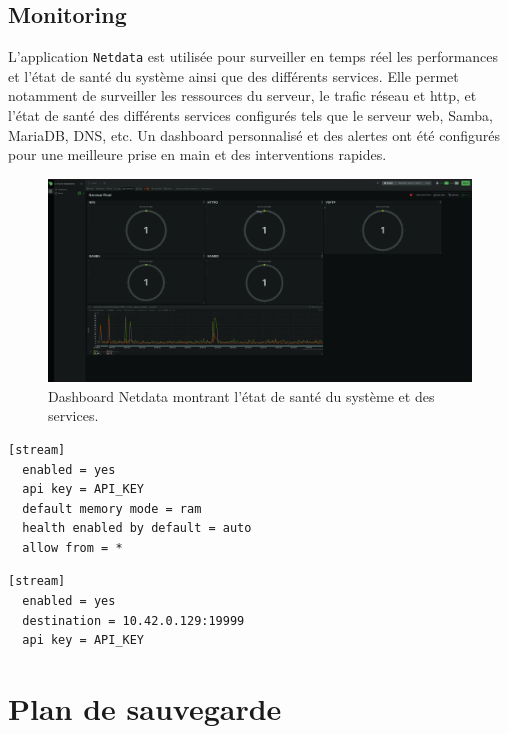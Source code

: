 \documentclass[a4paper,12pt]{article}
\begin{document}
\subsection{Monitoring}

L'application  \texttt{Netdata} est utilisée pour surveiller en temps réel les performances et l'état de santé du système ainsi que des différents services. Elle permet notamment de surveiller les ressources du serveur, le trafic réseau et http, et l'état de santé des différents services configurés tels que le serveur web, Samba, MariaDB, DNS, etc. Un dashboard personnalisé et des alertes ont été configurés pour une meilleure prise en main et des interventions rapides.

\begin{figure}[htbp]
    \centering
    \includegraphics[width=\textwidth]{netdata.png}
    \caption{Dashboard Netdata montrant l'état de santé du système et des services.}
    \label{fig:netdata-dashboard}
\end{figure}

\begin{lstlisting}[caption={Configuration Netdata Serveur – /etc/netdata/stream.conf}]
[stream]
  enabled = yes
  api key = API_KEY
  default memory mode = ram
  health enabled by default = auto
  allow from = *
\end{lstlisting}

\begin{lstlisting}[caption={Configuration Netdata Client – /etc/netdata/stream.conf}]
[stream]
  enabled = yes
  destination = 10.42.0.129:19999
  api key = API_KEY
\end{lstlisting}

\section{Plan de sauvegarde}
\end{document}
